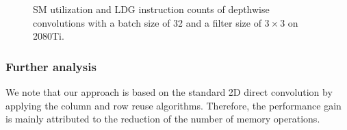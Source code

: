 \begin{figure}
    \centering
    \qquad
    \vspace{-2mm}
    \caption{SM utilization and LDG instruction counts of depthwise convolutions with a batch size of 32 and a filter size of $3\times3$ on 2080Ti.}
    \label{fig:dwratio}
\end{figure}

\subsubsection{Further analysis}
We note that our approach is based on the standard 2D direct convolution by applying the column and row reuse algorithms. 
Therefore, the performance gain is mainly attributed to the reduction of the number of memory operations. 

